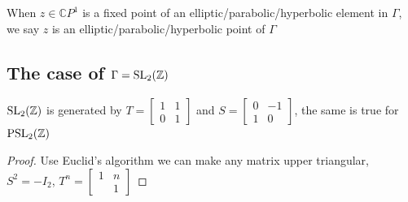 \documentclass[main]{subfiles}
\begin{document}
\begin{definition}
When $z\in\mathbb CP^1$ is a fixed point of an elliptic/parabolic/hyperbolic element in $\Gamma$, we say $z$ is an elliptic/parabolic/hyperbolic point of $\Gamma$
\end{definition}

\subsection{The case of $\Gamma=\operatorname{SL}_2(\mathbb Z)$}

\begin{exercise}
$\operatorname{SL}_2(\mathbb Z)$ is generated by $T=\begin{bmatrix}
1&1 \\
0&1
\end{bmatrix}$ and $S=\begin{bmatrix}
0&-1 \\
1&0
\end{bmatrix}$, the same is true for $\operatorname{PSL}_2(\mathbb Z)$
\end{exercise}

\begin{proof}
Use Euclid's algorithm we can make any matrix upper triangular, $S^2=-I_2$, $T^n=\begin{bmatrix}
1&n \\
&1
\end{bmatrix}$
\end{proof}
\end{document}
